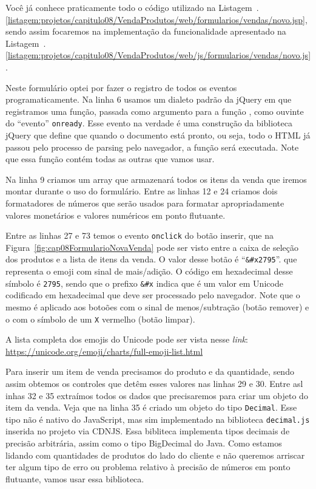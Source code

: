 Você já conhece praticamente todo o código utilizado na Listagem~\thechapter.\ref{listagem:projetos/capitulo08/VendaProdutos/web/formularios/vendas/novo.jsp}, sendo assim focaremos na implementação da funcionalidade apresentado na Listagem~\thechapter.\ref{listagem:projetos/capitulo08/VendaProdutos/web/js/formularios/vendas/novo.js}.


Neste formulário optei por fazer o registro de todos os eventos programaticamente. Na linha 6 usamos um dialeto padrão da jQuery em que registramos uma função, passada como argumento para a função , como ouvinte do ``evento'' \texttt{onready}. Esse evento na verdade é uma construção da biblioteca jQuery que define que quando o documento está pronto, ou seja, todo o HTML já passou pelo processo de parsing pelo navegador, a função será executada. Note que essa função contém todas as outras que vamos usar.

Na linha 9 criamos um array que armazenará todos os itens da venda que iremos montar durante o uso do formulário. Entre as linhas 12 e 24 criamos dois formatadores de números que serão usados para formatar apropriadamente valores monetários e valores numéricos em ponto flutuante.

Entre as linhas 27 e 73 temos o evento \texttt{onclick} do botão inserir, que na Figura~\ref{fig:cap08FormularioNovaVenda} pode ser visto entre a caixa de seleção dos produtos e a lista de itens da venda. O valor desse botão é ``\texttt{\&\#x2795}''. que representa o emoji com sinal de mais/adição. O código em hexadecimal desse símbolo é \texttt{2795}, sendo que o prefixo \texttt{\&\#x} indica que é um valor em Unicode codificado em hexadecimal que deve ser processado pelo navegador. Note que o mesmo é aplicado aos botoões com o sinal de menos/subtração (botão remover) e o com o símbolo de um \texttt{X} vermelho (botão limpar).

\begin{saibaMais}
    A lista completa dos emojis do Unicode pode ser vista nesse \textit{link}: \url{https://unicode.org/emoji/charts/full-emoji-list.html}
\end{saibaMais}

Para inserir um item de venda precisamos do produto e da quantidade, sendo assim obtemos os controles que detêm esses valores nas linhas 29 e 30. Entre asl inhas 32 e 35 extraímos todos os dados que precisaremos para criar um objeto do item da venda. Veja que na linha 35 é criado um objeto do tipo \texttt{Decimal}. Esse tipo não é nativo do JavaScript, mas sim implementado na biblioteca \texttt{decimal.js} inserida no projeto via CDNJS. Essa bibliteca implementa tipos decimais de precisão arbitrária, assim como o tipo BigDecimal do Java. Como estamos lidando com quantidades de produtos do lado do cliente e não queremos arriscar ter algum tipo de erro ou problema relativo à precisão de números em ponto flutuante, vamos usar essa biblioteca.

